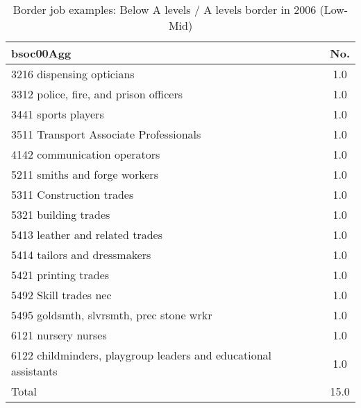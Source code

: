 \begin{table}[h!]
	\centering
	\caption{Border job examples: Below A levels / A levels border in 2006 (Low-Mid)}
	\label{tab:360112}
	\begin{tabular}{lc}
	\toprule
bsoc00Agg&No. \\
\hline
3216 dispensing opticians&1.0 \\
3312 police, fire, and prison officers&1.0 \\
3441 sports players&1.0 \\
3511 Transport Associate Professionals&1.0 \\
4142 communication operators&1.0 \\
5211 smiths and forge workers&1.0 \\
5311 Construction trades&1.0 \\
5321 building trades&1.0 \\
5413 leather and related trades&1.0 \\
5414 tailors and dressmakers&1.0 \\
5421 printing trades&1.0 \\
5492 Skill trades nec&1.0 \\
5495 goldsmth, slvrsmth, prec stone wrkr&1.0 \\
6121 nursery nurses&1.0 \\
6122 childminders, playgroup leaders and educational assistants&1.0 \\
Total&15.0 \\
\bottomrule
\bottomrule
\end{tabular}
\end{table}
